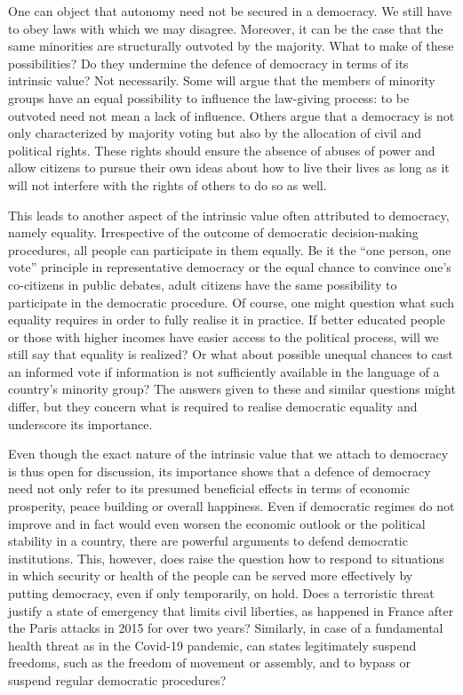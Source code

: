\documentclass[11pt]{article}
\begin{document}
One can object that autonomy need not be secured in a democracy. We still have to obey laws with which we may disagree. Moreover, it can be the case that the same minorities are structurally outvoted by the majority. What to make of these possibilities? Do they undermine the defence of democracy in terms of its intrinsic value? Not necessarily. Some will argue that the members of minority groups have an equal possibility to influence the law-giving process: to be outvoted need not mean a lack of influence. Others argue that a democracy is not only characterized by majority voting but also by the allocation of civil and political rights. These rights should ensure the absence of abuses of power and allow citizens to pursue their own ideas about how to live their lives as long as it will not interfere with the rights of others to do so as well.

This leads to another aspect of the intrinsic value often attributed to democracy,
namely equality. Irrespective of the outcome of democratic decision-making procedures, all people can participate in them equally. Be it the “one person,
one vote” principle in representative democracy or the equal chance to convince one’s co-citizens in public debates, adult citizens have the same possibility to participate in the democratic procedure. Of course, one might question what such equality requires in order to fully realise it in practice. If better educated people or those with higher incomes have easier access to the political process,
will we still say that equality is realized? Or what about possible unequal chances to cast an informed vote if information is not sufficiently available in the language of a country’s minority group? The answers given to these and similar questions might differ, but they concern what is required to realise democratic equality and underscore its importance.

Even though the exact nature of the intrinsic value that we attach to democracy is thus open for discussion, its importance shows that a defence of democracy need not only refer to its presumed beneficial effects in terms of economic prosperity, peace building or overall happiness. Even if democratic regimes do not improve and in fact would even worsen the economic outlook or the political stability in a country, there are powerful arguments to defend democratic institutions. This, however, does raise the question how to respond to situations in which security or health of the people can be served more effectively by putting democracy, even if only temporarily, on hold. Does a terroristic threat justify a state of emergency that limits civil liberties, as happened in France after the Paris attacks in 2015 for over two years? Similarly, in case of a fundamental health threat as in the Covid-19 pandemic, can states legitimately suspend freedoms, such as the freedom of movement or assembly, and to bypass or suspend regular democratic procedures?
\end{document}
